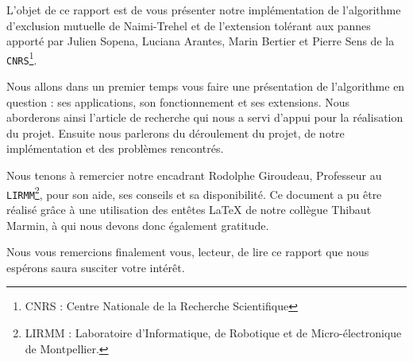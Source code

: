 L'objet de ce rapport est de vous présenter notre implémentation de l'algorithme d'exclusion mutuelle de Naimi-Trehel et de l'extension tolérant aux pannes apporté par \mbox{Julien} \mbox{Sopena}, \mbox{Luciana} \mbox{Arantes}, \mbox{Marin} \mbox{Bertier} et \mbox{Pierre} \mbox{Sens} de la \mbox{\texttt{CNRS}}\footnote{CNRS : Centre Nationale de la Recherche Scientifique}.

Nous allons dans un premier temps vous faire une présentation de l’algorithme en question : ses applications, son fonctionnement et ses extensions. Nous aborderons ainsi l’article de recherche qui nous a servi d’appui pour la réalisation du projet. Ensuite nous parlerons du déroulement du projet, de notre implémentation et des problèmes rencontrés.

Nous tenons à remercier notre encadrant \mbox{Rodolphe} \mbox{Giroudeau}, Professeur au \mbox{\texttt{LIRMM}}\footnote{LIRMM : Laboratoire d'Informatique, de Robotique et de Micro-électronique de Montpellier.}, pour son aide, ses conseils et sa disponibilité. Ce document a pu être réalisé grâce à 
une utilisation des entêtes \LaTeX{} de notre collègue \mbox{Thibaut} \mbox{Marmin}, à qui nous devons donc également gratitude. 

Nous vous remercions finalement vous, lecteur, de lire ce rapport que nous espérons saura susciter votre intérêt.